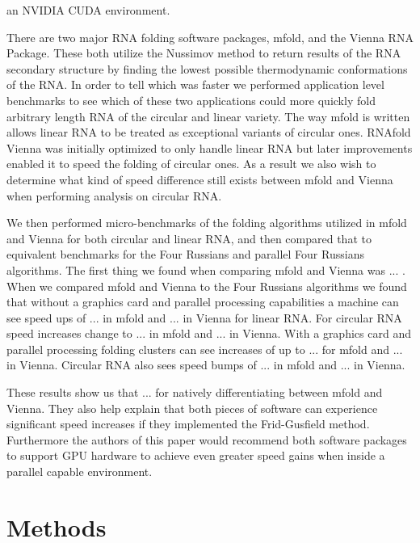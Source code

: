 \documentclass[12pt]{article}
\begin{document}
an NVIDIA CUDA environment\cite{balaji}.
\par There are two major RNA folding software packages, mfold\cite{zuker1989,zuker1981},
and the Vienna RNA Package\cite{vienna}. These both utilize the Nussimov method
to return results of the RNA secondary structure by finding the lowest possible
thermodynamic conformations of the RNA\cite{zuker1981,vienna}. In order to tell
which was faster we performed application level benchmarks\cite{eulogy} to see
which of these two applications could more quickly fold arbitrary length RNA of
the circular and linear variety. The way mfold is written allows linear RNA to
be treated as exceptional variants of circular ones\cite{circular}. RNAfold
Vienna was initially optimized to only handle linear RNA\cite{circular} but
later improvements enabled it to speed the folding of circular ones\cite{circular}.
As a result we also wish to determine what kind of speed difference still exists
between mfold and Vienna when performing analysis on circular RNA.

\par We then performed micro-benchmarks\cite{sysperformance} of the folding
algorithms utilized in mfold and Vienna for both circular and linear RNA, and
then compared that to equivalent benchmarks for the Four Russians and parallel
Four Russians algorithms. The first thing we found when comparing mfold and
Vienna was ... . When we compared mfold and Vienna to the Four Russians algorithms
we found that without a graphics card and parallel processing capabilities a
machine can see speed ups of ... in mfold and ... in Vienna for linear RNA. For
circular RNA speed increases change to ... in mfold and ... in Vienna. With a
graphics card and parallel processing folding clusters can see increases of up
to ... for mfold and ... in Vienna. Circular RNA also sees speed bumps of ... in
mfold and ... in Vienna.
\par These results show us that ... for natively differentiating between mfold
and Vienna. They also help explain that both pieces of software can experience
significant speed increases if they implemented the Frid-Gusfield method. Furthermore
the authors of this paper would recommend both software packages to support GPU
hardware to achieve even greater speed gains when inside a parallel capable
environment.

\section{Methods}
\end{document}
